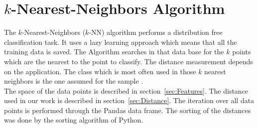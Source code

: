 ﻿\section{$k$-Nearest-Neighbors Algorithm}
\label{sec:TheoryKnn}
The $k$-Nearest-Neighbors ($k$-NN) algorithm performs a distribution free classification task. It uses a lazy learning approach which means that all the training data is saved. The Algorithm searches in that data base for the $k$ points which are the nearest to the point to classify. The distance measurement depends on the application. The class which is most often used in those $k$ nearest neighbors is the one assumed for the sample \cite[p.~338~f.]{bib:Alzate2007}.\\
The space of the data points is described in section~\ref{sec:Features}. The distance used in our work is described in section~\ref{sec:Distance}. The iteration over all data points is performed through the Pandas data frame. The sorting of the distances was done by the sorting algorithm of Python.

